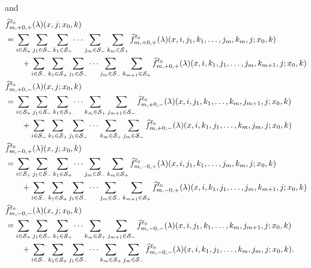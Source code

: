 and
\begin{align}
	\nonumber&\widehat f_{m,+0,+}^{\ell_0}(\lambda)( x,j;x_0,k) 
	\\&= \sum_{i\in\mathcal{S}_+}\sum_{j_1\in\mathcal S_-} \sum_{k_1\in\mathcal S_+}\dots \sum_{j_m\in\mathcal S_-}\sum_{k_m\in\mathcal S_+}\widehat  f_{m,+0,+}^{\ell_0}(\lambda)( x,i,j_1,k_1,\dots,j_m,k_m, j; x_0,k)  \nonumber 
	\\&\qquad {} + \sum_{i\in\mathcal{S}_-}\sum_{k_1\in\mathcal S_+}\sum_{j_1\in\mathcal S_-} \dots \sum_{j_m\in\mathcal S_-}\sum_{k_{m+1}\in\mathcal S_+}\widehat  f_{m,+0,+}^{\ell_0}(\lambda)( x,i,k_1,j_1,\dots,j_m,k_{m+1}, j; x_0,k)  \label{eqn: f advh2}
	\\\nonumber&\widehat f_{m,+0,-}^{\ell_0}(\lambda)( x,j;x_0,k) 
	\\&= \sum_{i\in\mathcal{S}_+}\sum_{j_1\in\mathcal S_-} \sum_{k_1\in\mathcal S_+}\dots \sum_{k_m\in\mathcal S_+}\sum_{j_{m+1}\in\mathcal S_-}\widehat  f_{m,+0,-}^{\ell_0}(\lambda)( x,i,j_1,k_1,\dots,k_m,j_{m+1}, j; x_0,k)  \nonumber 
	\\&\qquad {} + \sum_{i\in\mathcal{S}_-}\sum_{k_1\in\mathcal S_+}\sum_{j_1\in\mathcal S_-} \dots\sum_{k_{m}\in\mathcal S_+} \sum_{j_m\in\mathcal S_-}\widehat  f_{m,+0,-}^{\ell_0}(\lambda)( x,i,k_1,j_1,\dots,k_{m},j_m, j; x_0,k)
	\\\nonumber&\widehat f_{m,-0,+}^{\ell_0}(\lambda)( x,j;x_0,k) 
	\\&= \sum_{i\in\mathcal{S}_+}\sum_{j_1\in\mathcal S_-} \sum_{k_1\in\mathcal S_+}\dots\sum_{j_{m}\in\mathcal S_-} \sum_{k_m\in\mathcal S_+}\widehat  f_{m,-0,+}^{\ell_0}(\lambda)( x,i,j_1,k_1,\dots,j_{m},k_m, j; x_0,k)  \nonumber 
	\\&\qquad {} + \sum_{i\in\mathcal{S}_-}\sum_{k_1\in\mathcal S_+}\sum_{j_1\in\mathcal S_-} \dots \sum_{j_m\in\mathcal S_-}\sum_{k_{m+1}\in\mathcal S_+}\widehat  f_{m,-0,+}^{\ell_0}(\lambda)( x,i,k_1,j_1,\dots,j_{m},k_{m+1}, j; x_0,k)
	\\\nonumber&\widehat f_{m,-0,-}^{\ell_0}(\lambda)( x,j;x_0,k) 
	\\&= \sum_{i\in\mathcal{S}_+}\sum_{j_1\in\mathcal S_-} \sum_{k_1\in\mathcal S_+}\dots \sum_{k_m\in\mathcal S_+}\sum_{j_{m+1}\in\mathcal S_-}\widehat  f_{m,-0,-}^{\ell_0}(\lambda)( x,i,j_1,k_1,\dots,k_m,j_{m+1}, j; x_0,k)  \nonumber 
	\\&\qquad {} + \sum_{i\in\mathcal{S}_-}\sum_{k_1\in\mathcal S_+}\sum_{j_1\in\mathcal S_-} \dots \sum_{k_{m}\in\mathcal S_+}\sum_{j_m\in\mathcal S_-}\widehat  f_{m,-0,-}^{\ell_0}(\lambda)( x,i,k_1,j_1,\dots,k_{m},j_m, j; x_0,k) .
\end{align}


